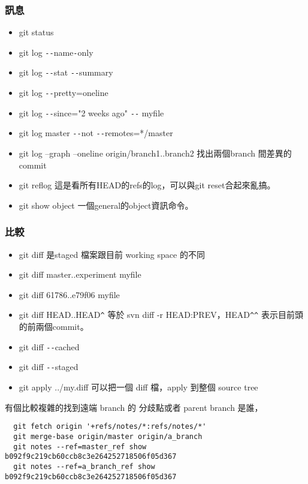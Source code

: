   \subsubsection{訊息}
  \begin{itemize}
    \item git status
    \item git log \verb=--=name\verb=-=only
    \item git log \verb=--=stat \verb=--=summary
    \item git log \verb=--=pretty=oneline
    \item git log \verb=--=since="2 weeks ago" \verb=--= myfile
    \item git log master \verb=--=not \verb=--=remotes=*/master
    \item git log --graph --oneline origin/branch1..branch2 找出兩個branch 間差異的 commit
    \item git reflog 這是看所有HEAD的refs的log，可以與git reset合起來亂搞。
    \item git show object 一個general的object資訊命令。
  \end{itemize}
  \subsubsection{比較}
  \begin{itemize}
    \item git diff 是staged 檔案跟目前 working space 的不同
    \item git diff master..experiment myfile
    \item git diff 61786..e79f06 myfile
    \item git diff HEAD..HEAD\verb=^= 等於 svn diff -r HEAD:PREV，HEAD\verb=^^=
      表示目前頭的前兩個commit。
    \item git diff \verb=--=cached
    \item git diff \verb=--=staged
    \item git apply ../my.diff 可以把一個 diff 檔，apply 到整個 source tree
  \end{itemize}
  有個比較複雜的找到遠端 branch 的 分歧點或者 parent branch 是誰，
  \begin{verbatim}
  git fetch origin '+refs/notes/*:refs/notes/*'
  git merge-base origin/master origin/a_branch
  git notes --ref=master_ref show b092f9c219cb60ccb8c3e264252718506f05d367
  git notes --ref=a_branch_ref show b092f9c219cb60ccb8c3e264252718506f05d367
  \end{verbatim}
